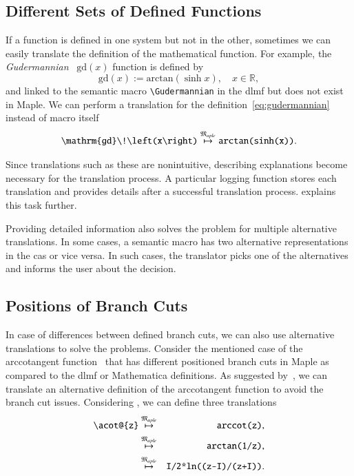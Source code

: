 \documentclass[a4paper,11pt]{article}
\newcommand{\Maple}{Maple}
\newcommand{\Mathematica}{Mathematica}
\newcommand{\langMaple}{\mathfrak{M}_{aple}}
\theoremstyle{defTheoStyle}
\theoremstyle{defExampStyle}
\DeclareRobustCommand{\Real}{\mathbb{R}}
\newcommand{\Gudermannian}[1]{\mathrm{gd}\!\left(#1\right)}
\newcommand{\atan}[1]{\mathrm{arctan}\!\left(#1\right)}
\begin{document}
\subsection{Different Sets of Defined Functions}
If a function is defined in one system but not in the other, sometimes we can easily translate the definition of the mathematical function. For example, the \textit{Gudermannian}~\parencite[(4.23.10)]{NIST:DLMF} $\Gudermannian{x}$ function is defined by
\begin{equation}\label{eq:gudermannian}
\Gudermannian{x} := \atan{\sinh{x}}, \quad x \in \Real,
\end{equation}
and linked to the semantic macro \verb|\Gudermannian| in the \gls*{dlmf} but does not exist in \Maple. We can perform a translation for the definition~\eqref{eq:gudermannian} instead of macro itself
\begin{equation}\label{eq:guder-trans}
\verb|\Gudermannian{x}| \overset{\langMaple}{\mapsto} \texttt{arctan(sinh(x))}.
\end{equation}

\vspace{-0.2cm}
Since translations such as these are nonintuitive, describing explanations become necessary for the translation process. A particular logging function stores each translation and provides details after a successful translation process.  explains this task further.

Providing detailed information also solves the problem for multiple alternative translations. In some cases, a semantic macro has two alternative representations in the \gls*{cas} or vice versa. In such cases, the translator picks one of the alternatives and informs the user about the decision.

\subsection{Positions of Branch Cuts}
In case of differences between defined branch cuts, we can also use alternative translations to solve the problems. Consider the mentioned case of the arccotangent function~\parencite{Branches:acot} that has different positioned branch cuts in \Maple{} as compared to the \gls*{dlmf} or \Mathematica{} definitions. As suggested by~\parencite{Branches:acot}, we can translate an alternative definition of the arccotangent function to avoid the branch cut issues. Considering 
\parencite[(23), (25)]{Branches:acot}, we can define three translations
\begin{eqnarray}
\verb|\acot@{z}| & \overset{\langMaple}{\mapsto} & \verb|arccot(z)|,\label{eq:acot-alternatives}\\
& \overset{\langMaple}{\mapsto} & \verb|arctan(1/z)|,\label{eq:acot-alternatives-1}\\
& \overset{\langMaple}{\mapsto} & \verb|I/2*ln((z-I)/(z+I))|.\label{eq:acot-alternatives-2}
\end{eqnarray}
\end{document}
